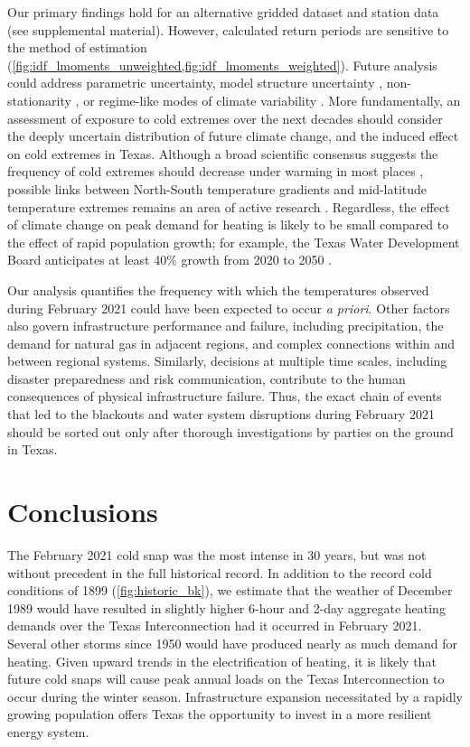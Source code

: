 \documentclass[12pt]{iopart}
\begin{document}
Our primary findings hold for an alternative gridded dataset and station data (see supplemental material).
However, calculated return periods are sensitive to the method of estimation (\cref{fig:idf_lmoments_unweighted,fig:idf_lmoments_weighted}).
Future analysis could address parametric uncertainty, model structure uncertainty \cite{wong_floodrisk:2018}, non-stationarity \cite{Milly:2008dg}, or regime-like modes of climate variability \cite{DossGollin:2019}.
More fundamentally, an assessment of exposure to cold extremes over the next decades should consider the deeply uncertain distribution of future climate change, and the induced effect on cold extremes in Texas.
Although a broad scientific consensus suggests the frequency of cold extremes should decrease under warming in most places \cite{ipcc_ar5:2014}, possible links between North-South temperature gradients and mid-latitude temperature extremes remains an area of active research \cite{Barnes:2013fp,Cohen:2014gx,Screen:2013ho}.
Regardless, the effect of climate change on peak demand for heating is likely to be small compared to the effect of rapid population growth; for example, the Texas Water Development Board anticipates at least 40\% growth from 2020 to 2050 \cite{texaswaterplan:2012}.

Our analysis quantifies the frequency with which the temperatures observed during February 2021 could have been expected to occur \emph{a priori}.
Other factors also govern infrastructure performance and failure, including precipitation, the demand for natural gas in adjacent regions, and complex connections within and between regional systems.
Similarly, decisions at multiple time scales, including disaster preparedness and risk communication, contribute to the human consequences of physical infrastructure failure.
Thus, the exact chain of events that led to the blackouts and water system disruptions during February 2021 should be sorted out only after thorough investigations by parties on the ground in Texas.

\section{Conclusions}

The February 2021 cold snap was the most intense in 30 years, but was not without precedent in the full historical record.
In addition to the record cold conditions of 1899 (\cref{fig:historic_bk}), we estimate that the weather of December 1989 would have resulted in slightly higher 6-hour and 2-day aggregate heating demands over the Texas Interconnection had it occurred in February 2021.
Several other storms since 1950 would have produced nearly as much demand for heating.
Given upward trends in the electrification of heating, it is likely that future cold snaps will cause peak annual loads on the Texas Interconnection to occur during the winter season.
Infrastructure expansion necessitated by a rapidly growing population offers Texas the opportunity to invest in a more resilient energy system.
\end{document}
